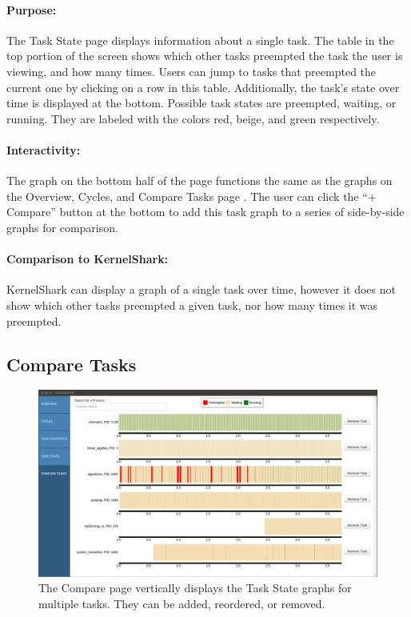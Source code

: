 \documentclass{hmcclinic}
\begin{document}
\paragraph{Purpose:}
    The Task State page displays information about a single task. The table in the top portion of the screen shows which other tasks preempted the task the user is viewing, and how many times. Users can jump to tasks that preempted the current one by
    clicking on a row in this table. Additionally, the task's state over time
    is displayed at the bottom. Possible task states are preempted, waiting, or
    running. They are labeled with the colors red, beige, and green respectively. 

\paragraph{Interactivity:}
    The graph on the bottom half of the page functions the same as the graphs on
    the Overview, Cycles, and Compare Tasks page
    . The user can click the ``+ Compare'' button at the bottom
    to add this task graph to a series of side-by-side graphs for comparison.
    
\paragraph{Comparison to KernelShark:}
     KernelShark can display a graph of a single task over time, however it does not show which other tasks preempted a given task, nor how many times it was preempted.
  
  \subsection{Compare Tasks} %
  
  \begin{figure}[H]
  \includegraphics[scale=0.3]{compare-page.png}
  \caption{The Compare page vertically displays the Task State graphs for
  multiple tasks. They can be added, reordered, or removed.}
  \end{figure}
\end{document}
